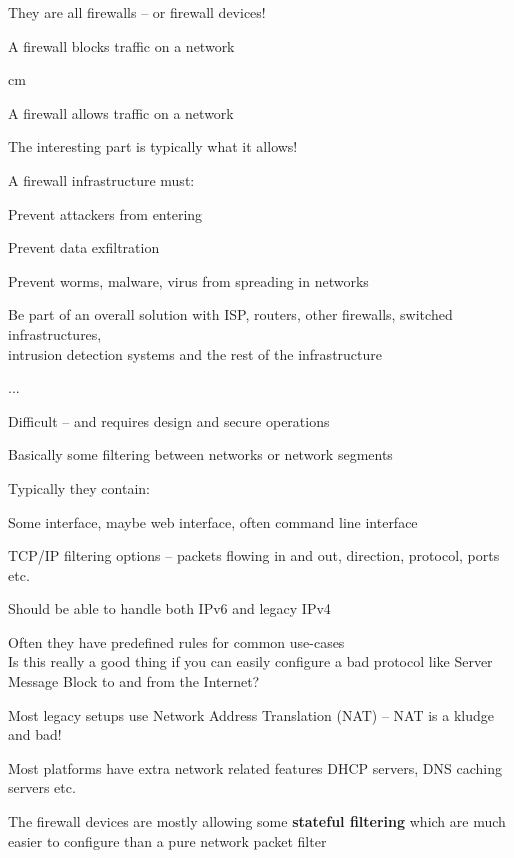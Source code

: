 \documentclass[Screen16to9,17pt]{foils}
\begin{document}
They are all firewalls -- or firewall devices!






\centerline{\hlkbig A firewall {\color{security6blue}blocks traffic} on a network}

 cm
\pause

\centerline{\hlkbig A firewall {\color{red}allows traffic} on a network}
{\small The interesting part is typically what it allows!}

\begin{list1}
\item A firewall infrastructure must:
\begin{list2}
\item Prevent attackers from entering
\item Prevent data exfiltration
\item Prevent worms, malware, virus from spreading in networks
\item Be part of an overall solution with ISP, routers, other firewalls, switched infrastructures,\\
  intrusion detection systems and the rest of the infrastructure
\item ...
\end{list2}
\end{list1}

\vskip 5mm
\centerline{Difficult -- and requires design and secure operations}



\begin{list1}
\item Basically some filtering between networks or network segments
\item Typically they contain:
  \begin{list2}
   \item Some interface, maybe web interface, often command line interface
\item TCP/IP filtering options -- packets flowing in and out, direction, protocol, ports etc.
\item Should be able to handle both IPv6 and legacy IPv4
\item Often they have predefined rules for common use-cases\\
Is this really a good thing if you can easily configure a bad protocol like Server Message Block to and from the Internet?
\item Most legacy setups use Network Address Translation (NAT) -- NAT is a kludge and bad!
\item Most platforms have extra network related features DHCP servers, DNS caching servers etc.
\end{list2}
\item The firewall devices are mostly allowing some {\bf stateful filtering} which are much easier to configure than a pure network packet filter
\end{list1}
\end{document}
